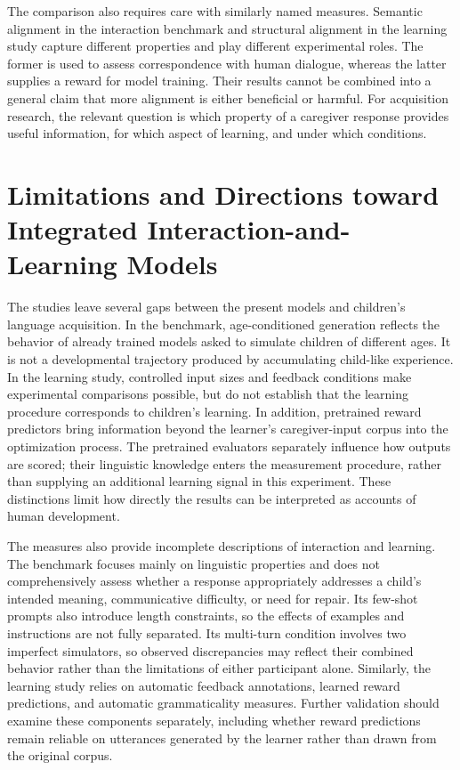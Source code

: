 The comparison also requires care with similarly named measures. Semantic alignment in the interaction benchmark and structural alignment in the learning study capture different properties and play different experimental roles. The former is used to assess correspondence with human dialogue, whereas the latter supplies a reward for model training. Their results cannot be combined into a general claim that more alignment is either beneficial or harmful. For acquisition research, the relevant question is which property of a caregiver response provides useful information, for which aspect of learning, and under which conditions.

\section{Limitations and Directions toward Integrated Interaction-and-Learning Models}

The studies leave several gaps between the present models and children's language acquisition. In the benchmark, age-conditioned generation reflects the behavior of already trained models asked to simulate children of different ages. It is not a developmental trajectory produced by accumulating child-like experience. In the learning study, controlled input sizes and feedback conditions make experimental comparisons possible, but do not establish that the learning procedure corresponds to children's learning. In addition, pretrained reward predictors bring information beyond the learner's caregiver-input corpus into the optimization process. The pretrained evaluators separately influence how outputs are scored; their linguistic knowledge enters the measurement procedure, rather than supplying an additional learning signal in this experiment. These distinctions limit how directly the results can be interpreted as accounts of human development.

The measures also provide incomplete descriptions of interaction and learning. The benchmark focuses mainly on linguistic properties and does not comprehensively assess whether a response appropriately addresses a child's intended meaning, communicative difficulty, or need for repair. Its few-shot prompts also introduce length constraints, so the effects of examples and instructions are not fully separated. Its multi-turn condition involves two imperfect simulators, so observed discrepancies may reflect their combined behavior rather than the limitations of either participant alone. Similarly, the learning study relies on automatic feedback annotations, learned reward predictions, and automatic grammaticality measures. Further validation should examine these components separately, including whether reward predictions remain reliable on utterances generated by the learner rather than drawn from the original corpus.

